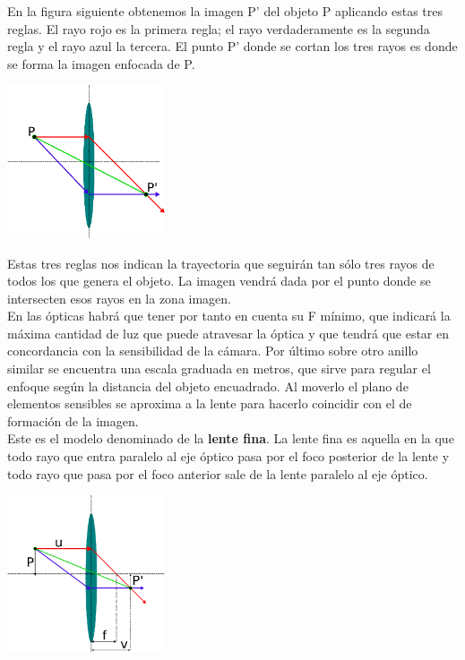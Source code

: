 En la figura siguiente obtenemos la imagen P' del objeto P aplicando estas tres reglas. El rayo rojo es la primera regla; 
el rayo verdaderamente es la segunda regla y el rayo azul la tercera. El punto P' donde se cortan los tres rayos es donde se forma la 
imagen enfocada de P.
\begin{center}
    \includegraphics[width=0.35\textwidth]{Capitulo2/Fig1_10.eps}
    \label{Fig1_10}
\end{center}
Estas tres reglas nos indican la trayectoria que seguirán tan sólo tres rayos de todos los que genera el objeto. La imagen vendrá 
dada por el punto donde se intersecten esos rayos en la zona imagen.\\
En las ópticas habrá que tener por
tanto en cuenta su F mínimo, que indicará la máxima cantidad de luz que puede
atravesar la óptica y que tendrá que estar en concordancia con la sensibilidad de la
cámara. Por último sobre otro anillo similar se encuentra una escala graduada en metros,
que sirve para regular el enfoque según la distancia del objeto encuadrado. Al moverlo
el plano de elementos sensibles se aproxima a la lente para hacerlo coincidir con el de
formación de la imagen.\\
Este es el modelo denominado de la \textbf{lente fina}. La
lente fina es aquella en la que todo rayo que entra paralelo al eje óptico pasa por el foco
posterior de la lente y todo rayo que pasa por el foco anterior sale de la lente paralelo al
eje óptico.
\begin{center}
    \includegraphics[width=0.35\textwidth]{Capitulo2/Fig1_11.eps}
    \label{Fig1_10}
\end{center}

